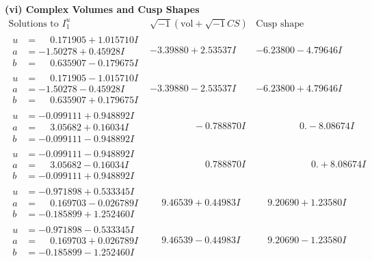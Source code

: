 \documentclass[1p]{elsarticle_modified}
\theoremstyle{definition}
\newcommand{\I}{\sqrt{-1}}
\begin{document}
\newpage\flushleft \textbf{(vi) Complex Volumes and Cusp Shapes}
$$\begin{array}{c|c|c}  
\text{Solutions to }I^u_{1}& \I (\text{vol} + \sqrt{-1}CS) & \text{Cusp shape}\\
 \hline 
\begin{aligned}
u &= \phantom{-}0.171905 + 1.015710 I \\
a &= -1.50278 + 0.45928 I \\
b &= \phantom{-}0.635907 - 0.179675 I\end{aligned}
 & -3.39880 + 2.53537 I & -6.23800 - 4.79646 I \\ \hline\begin{aligned}
u &= \phantom{-}0.171905 - 1.015710 I \\
a &= -1.50278 - 0.45928 I \\
b &= \phantom{-}0.635907 + 0.179675 I\end{aligned}
 & -3.39880 - 2.53537 I & -6.23800 + 4.79646 I \\ \hline\begin{aligned}
u &= -0.099111 + 0.948892 I \\
a &= \phantom{-}3.05682 + 0.16034 I \\
b &= -0.099111 - 0.948892 I\end{aligned}
 & \phantom{-0.000000 } -0.788870 I & \phantom{-0.000000 } 0. - 8.08674 I \\ \hline\begin{aligned}
u &= -0.099111 - 0.948892 I \\
a &= \phantom{-}3.05682 - 0.16034 I \\
b &= -0.099111 + 0.948892 I\end{aligned}
 & \phantom{-0.000000 -}0.788870 I & \phantom{-0.000000 -}0. + 8.08674 I \\ \hline\begin{aligned}
u &= -0.971898 + 0.533345 I \\
a &= \phantom{-}0.169703 - 0.026789 I \\
b &= -0.185899 + 1.252460 I\end{aligned}
 & \phantom{-}9.46539 + 0.44983 I & \phantom{-}9.20690 + 1.23580 I \\ \hline\begin{aligned}
u &= -0.971898 - 0.533345 I \\
a &= \phantom{-}0.169703 + 0.026789 I \\
b &= -0.185899 - 1.252460 I\end{aligned}
 & \phantom{-}9.46539 - 0.44983 I & \phantom{-}9.20690 - 1.23580 I \\ \hline\begin{aligned}

\end{aligned}
\end{array}$$
\end{document}
